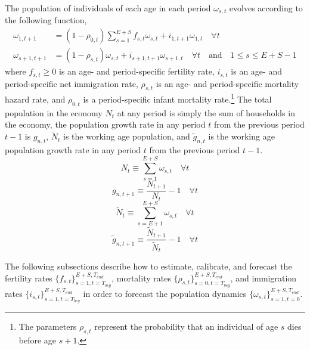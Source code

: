 \documentclass[letterpaper,12pt]{article}
\theoremstyle{definition}
\begin{document}
  The population of individuals of each age in each period $\omega_{s,t}$ evolves according to the following function,
  \begin{equation}\label{EqPopLawofmotion}
    \begin{split}
      \omega_{1,t+1} &= (1 - \rho_{0,t})\sum_{s=1}^{E+S} f_{s,t}\omega_{s,t} + i_{1,t+1}\omega_{1,t}\quad\forall t \\
      \omega_{s+1,t+1} &= (1 - \rho_{s,t})\omega_{s,t} + i_{s+1,t+1}\omega_{s+1,t}\quad\forall t\quad\text{and}\quad 1\leq s \leq E+S-1
    \end{split}
  \end{equation}
  where $f_{s,t}\geq 0$ is an age- and period-specific fertility rate, $i_{s,t}$ is an age- and period-specific net immigration rate, $\rho_{s,t}$ is an age- and period-specific mortality hazard rate, and $\rho_{0,t}$ is a period-specific infant mortality rate.\footnote{The parameters $\rho_{s,t}$ represent the probability that an individual of age $s$ dies before age $s+1$.} The total population in the economy $N_t$ at any period is simply the sum of households in the economy, the population growth rate in any period $t$ from the previous period $t-1$ is $g_{n,t}$, $\tilde{N}_t$ is the working age population, and $\tilde{g}_{n,t}$ is the working age population growth rate in any period $t$ from the previous period $t-1$.
  \begin{equation}\label{EqPopN}
    N_t\equiv\sum_{s=1}^{E+S} \omega_{s,t} \quad\forall t
  \end{equation}
  \begin{equation}\label{EqPopGrowth}
    g_{n,t+1} \equiv \frac{N_{t+1}}{N_t} - 1 \quad\forall t
  \end{equation}
  \begin{equation}\label{EqPopNtil}
    \tilde{N}_t\equiv\sum_{s=E+1}^{E+S} \omega_{s,t} \quad\forall t
  \end{equation}
  \begin{equation}\label{EqPopGrowthTil}
    \tilde{g}_{n,t+1} \equiv \frac{\tilde{N}_{t+1}}{\tilde{N}_t} - 1 \quad\forall t
  \end{equation}

  The following subsections describe how to estimate, calibrate, and forecast the fertility rates $\{f_{s,t}\}_{s=1,t=T_{beg}}^{E+S,T_{end}}$, mortality rates $\{\rho_{s,t}\}_{s=0,t=T_{beg}}^{E+S,T_{end}}$, and immigration rates $\{i_{s,t}\}_{s=1,t=T_{beg}}^{E+S,T_{end}}$ in order to forecast the population dynamics $\{\omega_{s,t}\}_{s=1,t=0}^{E+S,T_{end}}$.
\end{document}
